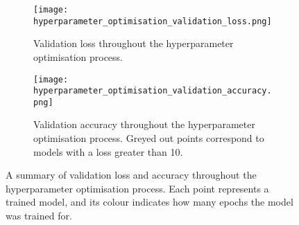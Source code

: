 \begin{figure}
    \centering
    \begin{subfigure}[t]{\textwidth}
        \texttt{[image: hyperparameter\_optimisation\_validation\_loss.png]}
        \label{fig:hyperparameter_optimisation_validation_loss}
        \caption{Validation loss throughout the hyperparameter optimisation process.}
    \end{subfigure}
    \par\bigskip %
    \par\bigskip
    \begin{subfigure}[b]{\textwidth}
        \texttt{[image: hyperparameter\_optimisation\_validation\_accuracy.png]}
        \label{fig:hyperparameter_optimisation_validation_accuracy}
        \caption{Validation accuracy throughout the hyperparameter optimisation process. Greyed out points correspond to models with a loss greater than 10.}
    \end{subfigure}
    \caption[Hyperparameter optimisation using the hyperband early stopping method.]{A summary of validation loss and accuracy throughout the hyperparameter optimisation process. Each point represents a trained model, and its colour indicates how many epochs the model was trained for.}
    \label{fig:hyperparameter_optimisation_validation_loss_and_accuracy}
\end{figure}

 
